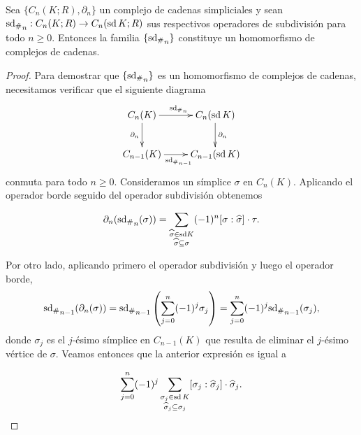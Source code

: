 \begin{lema}
	Sea $\{C_n(K; R), \partial_n\}$ un complejo de cadenas simpliciales y sean ${\operatorname{sd}_\#}_n : C_n(K; R) \to C_n(\operatorname{sd} K; R)$ sus respectivos operadores de subdivisión para todo $n \geq 0$. Entonces la familia $\{{\operatorname{sd}_\#}_n\}$ constituye un homomorfismo de complejos de cadenas.
\end{lema}
\begin{proof}
	Para demostrar que $\{{\operatorname{sd}_\#}_n\}$ es un homomorfismo de complejos de cadenas, necesitamos verificar que el siguiente diagrama
	\[
	\xymatrix{
		C_n(K) \ar[r]^{{\sd_\#}_n} \ar[d]_{\partial_n} & C_n(\sd K) \ar[d]^{\partial_n} \\
		C_{n-1}(K) \ar[r]_{{\sd_\#}_{n-1}} & C_{n-1}(\sd K)
	}
	\]
	conmuta para todo $n \geq 0$.
	Consideramos un símplice $\sigma$ en $C_n(K)$. Aplicando el operador borde seguido del operador subdivisión obtenemos
	
	\begin{equation}
		\label{eq:comp-subdv-borde}
	\partial_n ({\operatorname{sd}_\#}_n(\sigma)) = \sum_{\substack{\widehat{\sigma} \in \text{sd} K \\ \widehat{\sigma} \subseteq \sigma}} (-1)^{n} [\sigma : \widehat{\sigma}] \cdot \tau.
	\end{equation}
	
	Por otro lado, aplicando primero el operador subdivisión y luego el operador borde,
	\[
	{\operatorname{sd}_\#}_{n-1}(\partial_n(\sigma)) = {\operatorname{sd}_\#}_{n-1} \left( \sum_{j=0}^{n} (-1)^j \sigma_j \right) = \sum_{j=0}^{n} (-1)^j {\operatorname{sd}_\#}_{n-1}(\sigma_j),
	\]
	donde $\sigma_j$ es el $j$-ésimo símplice en $C_{n-1}(K)$ que resulta de eliminar el $j$-ésimo vértice de $\sigma$. Veamos entonces que la anterior expresión es igual a
	
	\begin{equation}
		\label{eq:comp-borde-subdv}
	\sum_{j=0}^{n} (-1)^j \sum_{\substack{\sigma_j \in \operatorname{sd} K \\ \widehat{\sigma}_j \subseteq \sigma_j}} [\sigma_j : \widehat{\sigma}_j] \cdot \widehat{\sigma}_j.
	\end{equation}
	

\end{proof}
